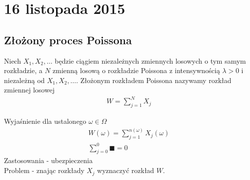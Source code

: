 \chapter{16 listopada 2015}
\section{Złożony proces Poissona}
\begin{defi}
Niech $ X_1,X_2,\dots  $ będzie ciągiem niezależnych zmiennych losowych o tym samym rozkładzie, a $ N $ zmienną losową o rozkładzie Poissona z intensywnością $ \lambda>0 $ i niezależną od $ X_1,X_2,\dots  $. Złożonym rozkładem Poissona nazywamy rozkład zmiennej losowej\begin{gather*}
W=\sum_{j=1}^{N}X_j
\end{gather*}
\end{defi}
Wyjaśnienie dla ustalonego $ \omega\in\Omega $
\begin{gather*}
W(\omega)=\sum_{j=1}^{n(\omega)}X_j(\omega)\\
\sum_{j=0}^{0}\blacksquare=0
\end{gather*}
Zastosowania - ubezpieczenia\\
Problem - znając rozkłady $ X_j $ wyznaczyć rozkład $ W $.
